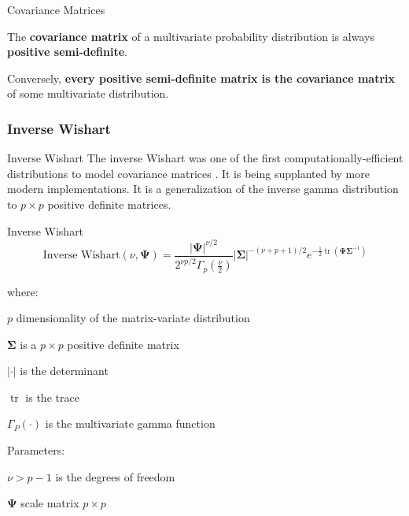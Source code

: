 \begin{frame}[noframenumbering]{Covariance Matrices}
	\begin{example}
		The \textbf{covariance matrix} of a multivariate probability distribution is always \textbf{positive semi-definite}.

		\vspace{0.5cm}

		Conversely, \textbf{every positive semi-definite matrix is the covariance matrix} of some multivariate distribution.
	\end{example}
\end{frame}

\subsubsection*{Inverse Wishart}
\begin{frame}[noframenumbering]{Inverse Wishart}
	The inverse Wishart was one of the first computationally-efficient distributions to model covariance matrices \parencite{gelman2013bayesian}.
	It is being supplanted by more modern implementations.
	\vfill
	It is a generalization of the inverse gamma distribution to $p \times p$ positive definite matrices.
\end{frame}

\begin{frame}[noframenumbering]{Inverse Wishart}
	$$\text{Inverse Wishart} (\nu, \boldsymbol{\Psi}) = \frac{\left|\boldsymbol{\Psi}\right|^{\nu/2}}{2^{\nu p/2}\Gamma_p(\frac{\nu}{2})} \left|\boldsymbol{\Sigma}\right|^{-(\nu+p+1)/2} e^{-\frac{1}{2}\operatorname{tr}(\boldsymbol{\Psi}\boldsymbol{\Sigma}^{-1})}$$

	where:
	\begin{vfilleditems}
		\item $p$ dimensionality of the matrix-variate distribution
		\item $\boldsymbol{\Sigma}$ is a $p \times p$ positive definite matrix
		\item $\left| \cdot \right|$ is the determinant
		\item $\operatorname{tr}$ is the trace
		\item $\Gamma_P \left( \cdot \right)$ is the multivariate gamma function
	\end{vfilleditems}
	\vfill
	Parameters:
	\begin{vfilleditems}
		\item $\nu > p-1$ is the degrees of freedom
		\item $\boldsymbol{\Psi}$ scale matrix $p \times p$
	\end{vfilleditems}
\end{frame}

